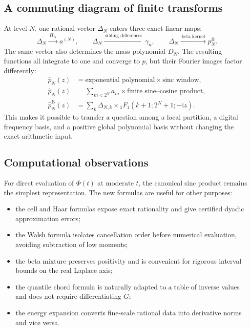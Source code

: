 \documentclass[11pt,oneside]{article}
\theoremstyle{definition}
\theoremstyle{remark}
\newcommand{\ii}{\mathrm i}
\begin{document}
\subsection{A commuting diagram of finite transforms}

At level $N$, one rational vector $\Delta_N$ enters three exact linear maps:
\begin{equation}\label{eq:commuting-maps}
 \Delta_N
 \xrightarrow{\ H_N\ }a^{(N)},
 \qquad
 \Delta_N\xrightarrow{\ \text{sibling differences}\ }\gamma_n,
 \qquad
 \Delta_N\xrightarrow{\ \text{beta kernel}\ }p_N^{\mathrm B}.
\end{equation}
The same vector also determines the mass polynomial $D_N$.  The resulting
functions all integrate to one and converge to $p$, but their Fourier images
factor differently:
\begin{align}
 \widehat p_N(z)&=\text{exponential polynomial}\times\text{sinc window},
 \label{eq:transform-type-cell}\\
 \widehat p_N(z)&=\sum_{m<2^N}a_m\times\text{finite sine--cosine product},
 \label{eq:transform-type-Walsh}\\
 \widehat p_N^{\mathrm B}(z)&=\sum_k\Delta_{N,k}\times{}_1F_1(k+1;2^N+1;-\ii z).
 \label{eq:transform-type-beta}
\end{align}
This makes it possible to transfer a question among a local partition, a
digital frequency basis, and a positive global polynomial basis without
changing the exact arithmetic input.

\subsection{Computational observations}

For direct evaluation of $\Phi(t)$ at moderate $t$, the canonical sinc product
remains the simplest representation.  The new formulas are useful for other
purposes:
\begin{itemize}
\item the cell and Haar formulas expose exact rationality and give certified
      dyadic approximation errors;
\item the Walsh formula isolates cancellation order before numerical
      evaluation, avoiding subtraction of low moments;
\item the beta mixture preserves positivity and is convenient for rigorous
      interval bounds on the real Laplace axis;
\item the quantile chord formula is naturally adapted to a table of inverse
      values and does not require differentiating $G$;
\item the energy expansion converts fine-scale rational data into derivative
      norms and vice versa.
\end{itemize}
\end{document}
